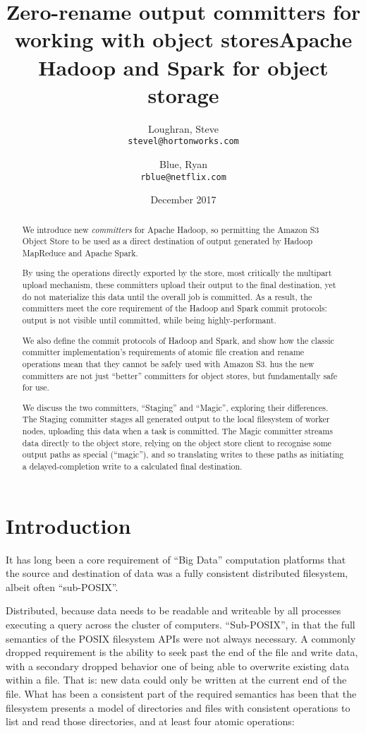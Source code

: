 \documentclass[9pt,technote]{IEEEtran}
\title{Zero-rename output committers for working with object storesApache Hadoop and Spark for object storage}
\author{
  Loughran, Steve\\
  \texttt{stevel@hortonworks.com}
\and
  Blue, Ryan\\
  \texttt{rblue@netflix.com}

}
\date{December 2017}
\begin{document}




\maketitle


\begin{abstract}

We introduce new \emph{committers} for Apache Hadoop, so permitting
the Amazon S3 Object Store to be used as a direct destination of output generated
by Hadoop MapReduce and Apache Spark.

By using the operations directly exported by
the store, most critically the multipart upload mechanism, these committers upload
their output to the final destination, yet do not materialize this data until the
overall job is committed.
As a result, the committers meet the core requirement of the Hadoop and Spark commit
protocols: output is not visible until committed, while being highly-performant.

We also define the commit protocols of Hadoop and Spark, and show how the classic committer
implementation's requirements of atomic file creation and rename operations mean that they
cannot be safely used with Amazon S3.
hus the new committers are not just ``better'' committers for object stores,
but fundamentally safe for use.

We discuss the two committers, ``Staging'' and ``Magic'', exploring their differences.
The Staging committer stages all generated output to the local filesystem of
worker nodes, uploading this data when a task is committed.
The Magic committer streams data directly to the object store, relying on the
object store client to recognise some output paths as special (``magic''), and
so translating writes to these paths as initiating a delayed-completion write to a calculated final destination.

\end{abstract}


\section{Introduction}
\label{sec:introduction}

It has long been a core requirement of ``Big Data'' computation platforms that
the source and destination of data was a fully consistent distributed filesystem,
albeit often ``sub-POSIX''.

Distributed, because data needs to be readable and writeable by all processes
executing a query across the cluster of computers.
``Sub-POSIX'', in that the full semantics of the POSIX filesystem APIs were not always necessary.
A commonly dropped requirement is the ability to seek past the end of the file and
write data, with a secondary dropped behavior one of being able to overwrite existing
data within a file.
That is: new data could only be written at the current end of the file.
What has been a consistent part of the required semantics has been that the filesystem
presents a model of directories and files with consistent operations to list and
read those directories, and at least four atomic operations:
\end{document}
